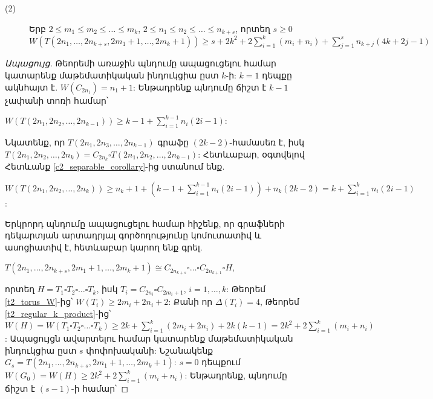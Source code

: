 \begin{hide}
\begin{theorem}
\begin{description}
\item[(2)] Երբ $2 \leq m_1 \leq m_2 \leq \ldots \leq m_k$, $2 \leq n_1 \leq n_2 \leq \ldots \leq n_{k+s}$, որտեղ $s\geq0$\\ 
$W\left( {T(2{n_1},\ldots,2{n_{k + s}},2{m_1} + 1,\ldots,2{m_k} + 1)} \right) \ge s + 2k^2 + 2\sum\limits_{i=1}^{k}{\left(m_i+n_i\right)} + \sum\limits_{j=1}^{s}{n_{k+j}(4k+2j-1)} $
\end{description}
\end{theorem}
\begin{proof}[Ապացույց]
Թեորեմի առաջին պնդումը ապացուցելու համար կատարենք մաթեմատիկական ինդուկցիա ըստ $k$-ի: $k=1$ դեպքը ակնհայտ է. $W(C_{2n_1})=n_1+1$: 
Ենթադրենք պնդումը ճիշտ է $k-1$ չափանի տոռի համար՝ 
\begin{center}
$W\left( T(2{n_1},2{n_2},\ldots,2{n_{k-1}}) \right) \ge k - 1 + \sum\limits_{i = 1}^{k-1} {{n_i}(2i - 1)}$:
\end{center}
Նկատենք, որ $T(2{n_1},2{n_3},\ldots,2{n_{k-1}})$ գրաֆը $(2k-2)$-համասեռ է, իսկ $T(2{n_1},2{n_2},\ldots,2{n_k}) = C_{2n_k} \square T(2{n_1},2{n_2},\ldots,2{n_{k-1}})$: Հետևաբար, օգտվելով Հետևանք \ref{c2_separable_corollary}-ից ստանում ենք.
\begin{center}
$W\left(T(2{n_1},2{n_2},\ldots,2{n_k})\right) \geq n_k+1 + (k-1 + \sum\limits_{i = 1}^{k-1} {{n_i}(2i - 1)}) + n_k(2k-2) = k + \sum\limits_{i = 1}^{k} {{n_i}(2i - 1)}$:
\end{center}
Երկրորդ պնդումը ապացուցելու համար հիշենք, որ գրաֆների դեկարտյան արտադրյալ գործողությունը կոմուտատիվ և ասոցիատիվ է, հետևաբար կարող ենք գրել.
\begin{center}
$T(2{n_1},\ldots,2{n_{k + s}},2{m_1} + 1,\ldots,2{m_k} + 1) \cong C_{2n_{k+s}} \square \ldots \square C_{2n_{k+1}} \square H$,
\end{center}
որտեղ $H=T_1 \square T_2 \square \ldots \square T_k$, իսկ $T_i = C_{2n_i} \square C_{2m_i+1}$, $i=1,\ldots,k$: Թեորեմ \ref{t2_torus_W}-ից՝ $W(T_i) \geq 2m_i + 2n_i + 2$: Քանի որ $\Delta(T_i) = 4$, Թեորեմ \ref{t2_regular_k_product}-ից՝\\
$W(H) = W\left( T_1 \square T_2 \square \ldots \square T_k \right) \geq 2k + \sum\limits_{i=1}^{k}{\left(2m_i+2n_i\right)} + 2k(k-1) = 2k^2 + 2\sum\limits_{i=1}^{k}{\left(m_i+n_i\right)}$: Ապացույցն ավարտելու համար կատարենք մաթեմատիկական ինդուկցիա ըստ $s$ փոփոխականի: Նշանակենք $G_s = T(2{n_1},\ldots,2{n_{k + s}},2{m_1} + 1,\ldots,2{m_k} + 1)$: 
$s=0$ դեպքում $W(G_0) = W(H) \geq 2k^2 + 2\sum\limits_{i=1}^{k}{\left(m_i+n_i\right)}$:
Ենթադրենք, պնդումը ճիշտ է $(s-1)$-ի համար՝

\end{proof}
\end{hide}

